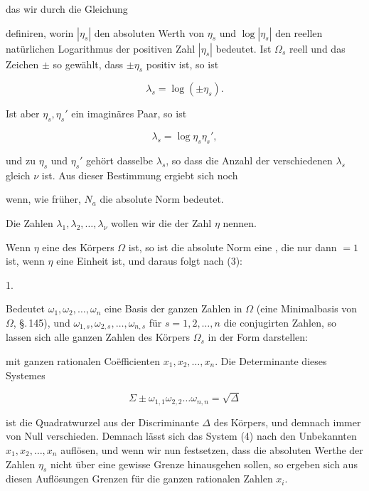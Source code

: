 das wir durch die Gleichung


definiren, worin $|\eta_s|$ den absoluten Werth von $\eta_s$ und $\log|\eta_s|$ den reellen natürlichen Logarithmus der positiven Zahl $|\eta_s|$ bedeutet. Ist $\Omega_s$ reell und das Zeichen $\pm$ so gewählt, dass $\pm \eta_s$ positiv ist, so ist

\[ \lambda_s = \log(\pm \eta_s). \]

Ist aber $\eta_s, \eta_s'$ ein imaginäres Paar, so ist

\[ \lambda_s = \log \eta_s \eta_s', \]

und zu $\eta_s$ und $\eta_s'$ gehört dasselbe $\lambda_s$, so dass die Anzahl der verschiedenen $\lambda_s$ gleich $\nu$ ist. Aus dieser Bestimmung ergiebt sich noch


wenn, wie früher, $N_a$ die absolute Norm bedeutet.

Die Zahlen $\lambda_1, \lambda_2, \ldots, \lambda_\nu$ wollen wir die  der Zahl $\eta$ nennen.

Wenn $\eta$ eine  des Körpers $\Omega$ ist, so ist die absolute Norm eine , die nur dann $= 1$ ist, wenn $\eta$ eine Einheit ist, und daraus folgt nach (3):

1. 

Bedeutet $\omega_1, \omega_2, \ldots, \omega_n$ eine Basis der ganzen Zahlen in $\Omega$ (eine Minimalbasis von $\Omega$, \S.\,145), und $\omega_{1,s}, \omega_{2,s}, \ldots, \omega_{n,s}$ für $s = 1, 2, \ldots, n$ die conjugirten Zahlen, so lassen sich alle ganzen Zahlen des Körpers $\Omega_s$ in der Form darstellen:


mit ganzen rationalen Co\"efficienten $x_1, x_2, \ldots, x_n$. Die Determinante dieses Systemes

\[ \Sigma \pm \omega_{1,1} \omega_{2,2} \ldots \omega_{n,n} = \sqrt{\Delta} \]

ist die Quadratwurzel aus der Discriminante $\Delta$ des Körpers, und demnach immer von Null verschieden. Demnach lässt sich das System (4) nach den Unbekannten $x_1, x_2, \ldots, x_n$ auflösen, und wenn wir nun festsetzen, dass die absoluten Werthe der Zahlen $\eta_s$ nicht über eine gewisse Grenze hinausgehen sollen, so ergeben sich aus diesen Auflösungen Grenzen für die ganzen rationalen Zahlen $x_i$.
